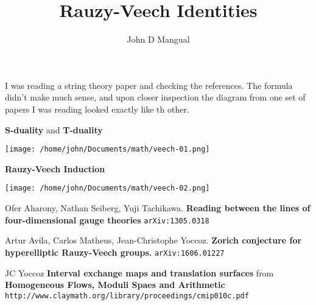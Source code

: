 \documentclass[12pt]{article}
\title{\textbf{ Rauzy-Veech Identities }}
\author{John D Mangual}
\date{}
\begin{document}
\selectfont \fontsize{25}{30}\selectfont

\maketitle

\noindent I was reading a string theory paper and checking the references.  The formula didn't make much sense, and upon closer inspection the diagram from one set of papers I was reading looked exactly like th other.


\newpage

\noindent\textbf{S-duality} and \textbf{T-duality}

\texttt{[image: /home/john/Documents/math/veech-01.png]}


\newpage

\noindent\textbf{Rauzy-Veech Induction}

\texttt{[image: /home/john/Documents/math/veech-02.png]}


\newpage

\selectfont \fontsize{12}{10}\selectfont

\begin{thebibliography}{}


\item Ofer Aharony, Nathan Seiberg, Yuji Tachikawa. \newline \textbf{Reading between the lines of four-dimensional gauge theories} \texttt{arXiv:1305.0318}

\item  Artur Avila, Carlos Matheus, Jean-Christophe Yoccoz. \newline \textbf{Zorich conjecture for hyperelliptic Rauzy-Veech groups.}  \texttt{arXiv:1606.01227}

\item JC Yoccoz \textbf{Interval exchange maps and translation surfaces} from \newline 
\textbf{Homogeneous Flows, Moduli Spaes and Arithmetic} \texttt{http://www.claymath.org/library/proceedings/cmip010c.pdf}


\end{thebibliography}
\end{document}
